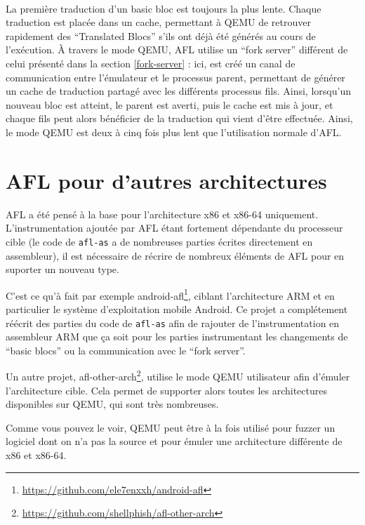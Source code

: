 \paragraph{}
La première traduction d'un basic bloc est toujours la plus lente.
Chaque traduction est placée dans un cache, permettant à QEMU de retrouver rapidement des ``Translated Blocs'' s'ils ont déjà été générés au cours de l'exécution.
À travers le mode QEMU, AFL utilise un ``fork server'' différent de celui présenté dans la section \ref{fork-server} : ici, est créé un canal de communication entre l'émulateur et le processus parent, permettant de générer un cache de traduction partagé avec les différents processus fils.
Ainsi, lorsqu'un nouveau bloc est atteint, le parent est averti, puis le cache est mis à jour, et chaque fils peut alors bénéficier de la traduction qui vient d'être effectuée.
Ainsi, le mode QEMU est deux à cinq fois plus lent que l'utilisation normale d'AFL.

\section{AFL pour d'autres architectures}

AFL a été pensé à la base  pour l'architecture x86 et x86-64 uniquement.
L'instrumentation ajoutée par AFL étant fortement dépendante du processeur cible (le code de \lstinline{afl-as} a de nombreuses parties écrites directement en assembleur), il est nécessaire de récrire de nombreux éléments de AFL pour en suporter un nouveau type.

C'est ce qu'à fait par exemple android-afl\footnote{\url{https://github.com/ele7enxxh/android-afl}}, ciblant l'architecture ARM et en particulier le système d'exploitation mobile Android.
Ce projet a complétement réécrit des parties du code de \lstinline{afl-as} afin de rajouter de l'instrumentation en assembleur ARM que ça soit pour les parties instrumentant les changements de ``basic blocs'' ou la communication avec le ``fork server''.

Un autre projet, afl-other-arch\footnote{\url{https://github.com/shellphish/afl-other-arch}}, utilise le mode QEMU utilisateur afin d'émuler l'architecture cible.
Cela permet de supporter alors toutes les architectures disponibles sur QEMU, qui sont très nombreuses.

Comme vous pouvez le voir, QEMU peut être à la fois utilisé pour fuzzer un logiciel dont on n'a pas la source et pour émuler une architecture différente de x86 et x86-64.
